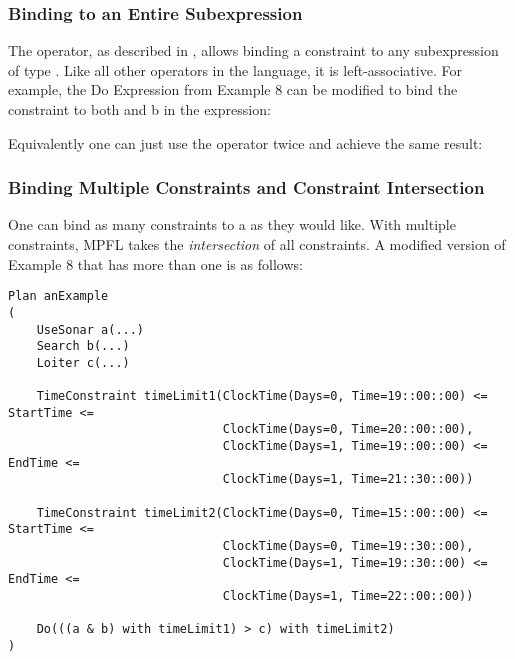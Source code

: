 \subsubsection{Binding to an Entire Subexpression}
The  operator, as described in , allows binding a constraint to any subexpression of type . Like all other operators in the language, it is left-associative. For example, the Do Expression from Example 8 can be modified to bind the constraint to both  and {b} in the expression:

\begin{center}
\end{center}

Equivalently one can just use the  operator twice and achieve the same result:

\begin{center}
\end{center}

\subsubsection{Binding Multiple Constraints and Constraint Intersection}
One can bind as many constraints to a  as they would like. With multiple constraints, MPFL takes the \emph{intersection} of all constraints. A modified version of Example 8 that has more than one  is as follows:

\begin{verbatim}
Plan anExample
(
    UseSonar a(...)
    Search b(...)
    Loiter c(...)

	TimeConstraint timeLimit1(ClockTime(Days=0, Time=19::00::00) <= StartTime <= 
	                          ClockTime(Days=0, Time=20::00::00), 
	                          ClockTime(Days=1, Time=19::00::00) <= EndTime <= 
	                          ClockTime(Days=1, Time=21::30::00))

	TimeConstraint timeLimit2(ClockTime(Days=0, Time=15::00::00) <= StartTime <= 
	                          ClockTime(Days=0, Time=19::30::00), 
	                          ClockTime(Days=1, Time=19::30::00) <= EndTime <= 
	                          ClockTime(Days=1, Time=22::00::00))
    
    Do(((a & b) with timeLimit1) > c) with timeLimit2)
)
\end{verbatim}
\\

